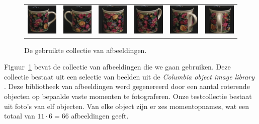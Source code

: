 \begin{figure}[p]
\begin{center}
\begin{tabular}{cccccc}
\includegraphics[width=2cm]{coil/beeld-60.eps} &
\includegraphics[width=2cm]{coil/beeld-61.eps} &
\includegraphics[width=2cm]{coil/beeld-62.eps} &
\includegraphics[width=2cm]{coil/beeld-63.eps} &
\includegraphics[width=2cm]{coil/beeld-64.eps} &
\includegraphics[width=2cm]{coil/beeld-65.eps} \\

\end{tabular}
\caption{\label{fig:testcollectie}De gebruikte collectie van afbeeldingen.}
\end{center}
\end{figure}

Figuur~\ref{fig:testcollectie} bevat de collectie van afbeeldingen die we gaan 
gebruiken. Deze collectie bestaat uit een selectie van beelden uit
de \emph{Columbia object image library} \cite{coil-100}. Deze bibliotheek van afbeeldingen 
werd gegenereerd 
door een aantal roterende objecten op bepaalde vaste momenten te fotograferen. 
Onze testcollectie bestaat uit foto's van elf objecten. Van elke object zijn
er zes momentopnames, wat een totaal van $11 \cdot 6 = 66$ afbeeldingen geeft.

